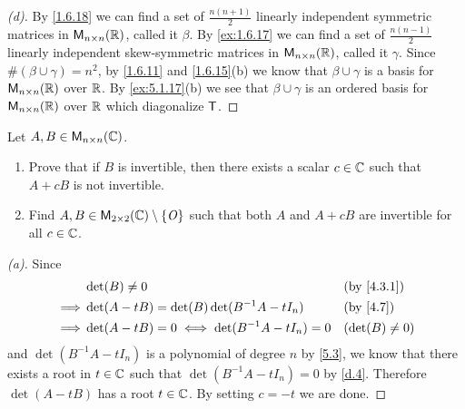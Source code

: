 \begin{proof}[(d)]
	By \cref{1.6.18} we can find a set of \(\frac{n(n + 1)}{2}\) linearly independent symmetric matrices in \(\ms[n][n][\R]\), called it \(\beta\).
	By \cref{ex:1.6.17} we can find a set of \(\frac{n(n - 1)}{2}\) linearly independent skew-symmetric matrices in \(\ms[n][n][\R]\), called it \(\gamma\).
	Since \(\#(\beta \cup \gamma) = n^2\), by \cref{1.6.11} and \cref{1.6.15}(b) we know that \(\beta \cup \gamma\) is a basis for \(\ms[n][n][\R]\) over \(\mathbb{R}\).
	By \cref{ex:5.1.17}(b) we see that \(\beta \cup \gamma\) is an ordered basis for \(\ms[n][n][\R]\) over \(\mathbb{R}\) which diagonalize \(\mathsf{T}\).
\end{proof}

\begin{ex}\label{ex:5.1.18}
	Let \(A, B \in \ms[n][n][\C]\).
	\begin{enumerate}
		\item Prove that if \(B\) is invertible, then there exists a scalar \(c \in \mathbb{C}\) such that \(A + cB\) is not invertible.
		\item Find \(A, B \in \ms[2][2][\C] \setminus \set{\zm}\) such that both \(A\) and \(A + cB\) are invertible for all \(c \in \mathbb{C}\).
	\end{enumerate}
\end{ex}

\begin{proof}[(a)]
	Since
	\begin{align*}
		         & \det(B) \neq 0                                   &  & \by{4.3.1}       \\
		\implies & \det(A - tB) = \det(B) \det(B^{-1} A - t I_n)    &  & \by{4.7}         \\
		\implies & \det(A - tB) = 0 \iff \det(B^{-1} A - t I_n) = 0 &  & (\det(B) \neq 0)
	\end{align*}
	and \(\det(B^{-1} A - t I_n)\) is a polynomial of degree \(n\) by \cref{5.3}, we know that there exists a root in \(t \in \mathbb{C}\) such that \(\det(B^{-1} A - t I_n) = 0\) by \cref{d.4}.
	Therefore \(\det(A - tB)\) has a root \(t \in \mathbb{C}\).
	By setting \(c = -t\) we are done.
\end{proof}


